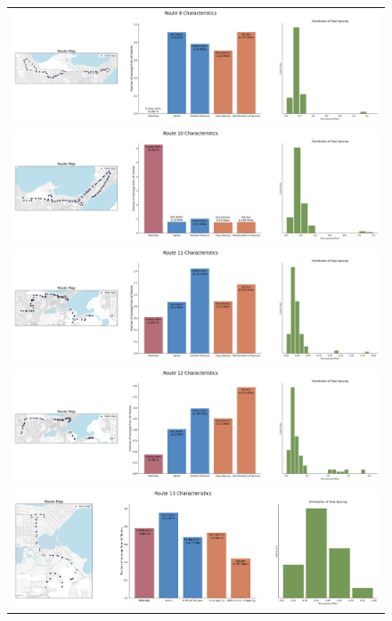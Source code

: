 \documentclass[letter]{article}
\begin{document}
\begin{figure}
\begin{center}
\begin{tabular}{ c }

  \includegraphics[width=150mm]{Route_8.png}  \\
  \includegraphics[width=150mm]{Route_10.png} \\
  \includegraphics[width=150mm]{Route_11.png} \\
  \includegraphics[width=150mm]{Route_12.png}  \\
  \includegraphics[width=150mm]{Route_13.png}  \\
  
  \end{tabular}
\end{center}
\end{figure}
\end{document}
